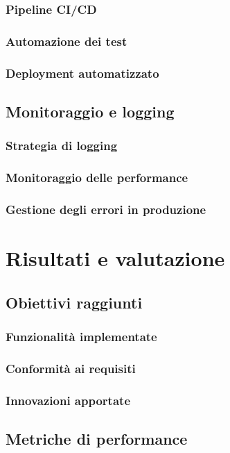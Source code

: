 \documentclass[12pt,a4paper,oneside]{report}
\begin{document}
\subsection{Pipeline CI/CD}
\subsection{Automazione dei test}
\subsection{Deployment automatizzato}

\section{Monitoraggio e logging}
\subsection{Strategia di logging}
\subsection{Monitoraggio delle performance}
\subsection{Gestione degli errori in produzione}





\chapter{Risultati e valutazione}
\section{Obiettivi raggiunti}
\subsection{Funzionalità implementate}
\subsection{Conformità ai requisiti}
\subsection{Innovazioni apportate}

\section{Metriche di performance}
\end{document}
